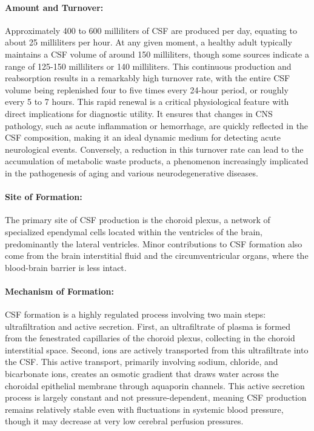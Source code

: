 \paragraph{Amount and Turnover:} Approximately 400 to 600 milliliters of CSF are produced per day, equating to about 25 milliliters per hour. At any given moment, a healthy adult typically maintains a CSF volume of around 150 milliliters, though some sources indicate a range of 125-150 milliliters or 140 milliliters. This continuous production and reabsorption results in a remarkably high turnover rate, with the entire CSF volume being replenished four to five times every 24-hour period, or roughly every 5 to 7 hours. This rapid renewal is a critical physiological feature with direct implications for diagnostic utility. It ensures that changes in CNS pathology, such as acute inflammation or hemorrhage, are quickly reflected in the CSF composition, making it an ideal dynamic medium for detecting acute neurological events. Conversely, a reduction in this turnover rate can lead to the accumulation of metabolic waste products, a phenomenon increasingly implicated in the pathogenesis of aging and various neurodegenerative diseases.
	
\paragraph{Site of Formation:} The primary site of CSF production is the choroid plexus, a network of specialized ependymal cells located within the ventricles of the brain, predominantly the lateral ventricles. Minor contributions to CSF formation also come from the brain interstitial fluid and the circumventricular organs, where the blood-brain barrier is less intact.
	
\paragraph{Mechanism of Formation:} CSF formation is a highly regulated process involving two main steps: ultrafiltration and active secretion. First, an ultrafiltrate of plasma is formed from the fenestrated capillaries of the choroid plexus, collecting in the choroid interstitial space. Second, ions are actively transported from this ultrafiltrate into the CSF. This active transport, primarily involving sodium, chloride, and bicarbonate ions, creates an osmotic gradient that draws water across the choroidal epithelial membrane through aquaporin channels. This active secretion process is largely constant and not pressure-dependent, meaning CSF production remains relatively stable even with fluctuations in systemic blood pressure, though it may decrease at very low cerebral perfusion pressures.
	
